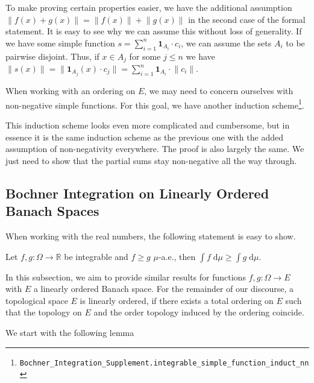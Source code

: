 \begin{remark}
To make proving certain properties easier, we have the additional assumption $\lVert f(x) + g(x) \rVert = \lVert f(x) \rVert + \lVert g(x) \rVert$ in the second case of the formal statement. It is easy to see why we can assume this without loss of generality. If we have some simple function $s = \sum_{i=1}^n \mathbf{1}_{A_i} \cdot c_i$, we can assume the sets $A_i$ to be pairwise disjoint. Thus, if $x \in A_j$ for some $j \le n$ we have $\lVert s(x) \rVert = \lVert \mathbf{1}_{A_j}(x) \cdot c_j\rVert = \sum_{i=1}^n \mathbf{1}_{A_i} \cdot \lVert c_i \rVert$.
\end{remark}

When working with an ordering on $E$, we may need to concern ourselves with non-negative simple functions. For this goal, we have another induction scheme\footnote{\texttt{Bochner\_Integration\_Supplement.integrable\_simple\_function\_induct\_nn}}.\label{ind:simple_nn}

This induction scheme looks even more complicated and cumbersome, but in essence it is the same induction scheme as the previous one with the added assumption of non-negativity everywhere. The proof is also largely the same. We just need to show that the partial sums stay non-negative all the way through.

\pagebreak
\subsection{Bochner Integration on Linearly Ordered Banach Spaces}

When working with the real numbers, the following statement is easy to show.
\begin{center}
Let $f, g : \Omega \rightarrow \mathbb{R}$ be integrable and $f \ge g$ $\mu$-a.e., then $\int f\;\textrm{d} \mu \ge \int g\;\textrm{d} \mu$. 
\end{center}
In this subsection, we aim to provide similar results for functions $f, g : \Omega \rightarrow E$ with $E$ a linearly ordered Banach space. For the remainder of our discourse, a topological space $E$ is linearly ordered, if there exists a total ordering on $E$ such that the topology on $E$ and the order topology induced by the ordering coincide.

We start with the following lemma


